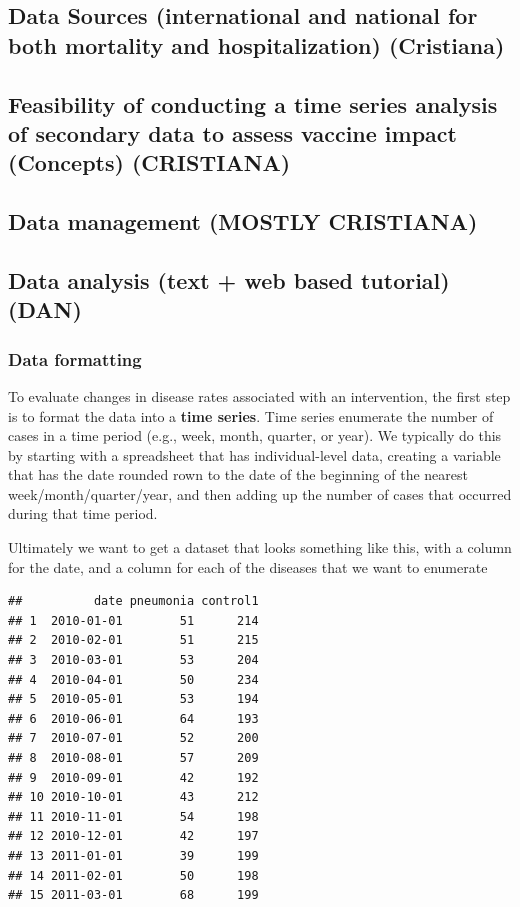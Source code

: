 \documentclass[]{article}
\begin{document}
\subsection{Data Sources (international and national for both mortality
and hospitalization)
(Cristiana)}\label{data-sources-international-and-national-for-both-mortality-and-hospitalization-cristiana}

\subsection{Feasibility of conducting a time series analysis of
secondary data to assess vaccine impact (Concepts)
(CRISTIANA)}\label{feasibility-of-conducting-a-time-series-analysis-of-secondary-data-to-assess-vaccine-impact-concepts-cristiana}

\subsection{Data management (MOSTLY
CRISTIANA)}\label{data-management-mostly-cristiana}

\subsection{Data analysis (text + web based tutorial)
(DAN)}\label{data-analysis-text-web-based-tutorial-dan}

\subsubsection{Data formatting}\label{data-formatting}

To evaluate changes in disease rates associated with an intervention,
the first step is to format the data into a \textbf{time series}. Time
series enumerate the number of cases in a time period (e.g., week,
month, quarter, or year). We typically do this by starting with a
spreadsheet that has individual-level data, creating a variable that has
the date rounded rown to the date of the beginning of the nearest
week/month/quarter/year, and then adding up the number of cases that
occurred during that time period.

Ultimately we want to get a dataset that looks something like this, with
a column for the date, and a column for each of the diseases that we
want to enumerate

\begin{verbatim}
##          date pneumonia control1
## 1  2010-01-01        51      214
## 2  2010-02-01        51      215
## 3  2010-03-01        53      204
## 4  2010-04-01        50      234
## 5  2010-05-01        53      194
## 6  2010-06-01        64      193
## 7  2010-07-01        52      200
## 8  2010-08-01        57      209
## 9  2010-09-01        42      192
## 10 2010-10-01        43      212
## 11 2010-11-01        54      198
## 12 2010-12-01        42      197
## 13 2011-01-01        39      199
## 14 2011-02-01        50      198
## 15 2011-03-01        68      199
\end{verbatim}
\end{document}
